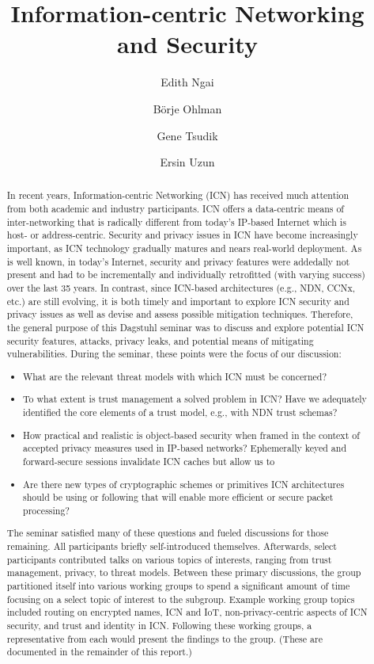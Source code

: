 \documentclass[a4paper,UKenglish]{dagrep}
\title{Information-centric Networking and Security}
\author[1]{Edith Ngai}
\author[2]{Börje Ohlman}
\author[3]{Gene Tsudik}
\author[4]{Ersin Uzun}
\affil[1]{Uppsala University, SE, \texttt{edith.ngai@it.uu.se}}
\affil[2]{Ericsson Research - Stockholm, SE, \texttt{borje.ohlman@ericsson.com}}
\affil[3]{University of California - Irvine, US, \texttt{gts@ics.uci.edu}}
\affil[4]{Xerox PARC - Palo Alto, US, \texttt{ersin.uzun@acm.org}}
\begin{document}
\maketitle

\begin{abstract}
In recent years, Information-centric Networking (ICN) has received much attention from both academic and industry participants. ICN offers a data-centric means of inter-networking that is radically different from today's IP-based Internet which is host- or address-centric. Security and privacy issues in ICN have become increasingly important, as ICN technology gradually matures and nears real-world deployment. As is well known, in today's Internet, security and privacy features were addedally not present and had to be incrementally and individually retrofitted (with varying success) over the last 35 years. In contrast, since ICN-based architectures (e.g., NDN, CCNx, etc.) are still evolving, it is both timely and important to explore ICN security and privacy issues as well as devise and assess possible mitigation techniques. Therefore, the general purpose of this Dagstuhl seminar was to discuss and explore potential ICN security features, attacks, privacy leaks, and potential means of mitigating vulnerabilities. During the seminar, these points were the focus of our discussion:

\begin{itemize}
\item What are the relevant threat models with which ICN must be concerned?
\item To what extent is trust management a solved problem in ICN? Have we adequately identified the core elements of a trust model, e.g., with NDN trust schemas?
\item How practical and realistic is object-based security when framed in the context of accepted privacy measures used in IP-based networks? Ephemerally keyed and forward-secure sessions invalidate ICN caches but allow us to 
\item Are there new types of cryptographic schemes or primitives ICN architectures should be using or following that will enable more efficient or secure packet processing?
\end{itemize}

The seminar satisfied many of these questions and fueled discussions for those remaining. All participants briefly self-introduced themselves. Afterwards, select participants contributed talks on various topics of interests, ranging from trust management, privacy, to threat models. Between these primary discussions, the group partitioned itself into various working groups to spend a significant amount of time focusing on a select topic of interest to the subgroup. Example working group topics included routing on encrypted names, ICN and IoT, non-privacy-centric aspects of ICN security, and trust and identity in ICN. Following these working groups, a representative from each would present the findings to the group. (These are documented in the remainder of this report.)


\end{abstract}
\end{document}
